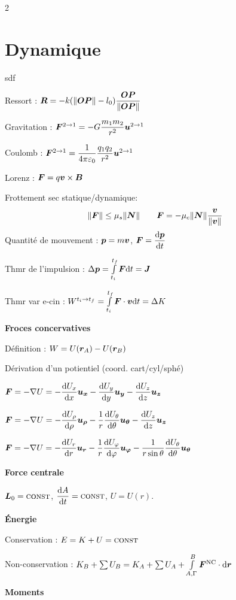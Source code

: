 \documentclass[10pt,a4paper,twoside]{article}
\begin{document}
\begin{multicols}{2}
\section*{Dynamique}

sdf

Ressort : $\bf{R} = -k (\|\bf{OP}\| - l_0) \frac{\bf{OP}}{\|\bf{OP}\|}$

Gravitation : $\bf{F}^{2 \to 1} = - G \frac{m_1m_2}{r^2}\bf{u}^{2\to 1}$

Coulomb :  $\bf{F}^{2 \to 1} = \frac{1}{4\pi \epsilon_0} \frac{q_1q_2}{r^2}\bf{u}^{2\to 1}$

Lorenz : $\bf{F} = q\bf{v}\times \bf{B}$

Frottement sec statique/dynamique:
\[
\|\bf{F}\| \leq  \mu_{s} \|\bf{N}\|  \quad  \quad 
\bf{F} = - \mu_{c} \|\bf{N}\| \frac{\bf{v}}{\|\bf{v}\|}
\]
\hr 
Quantité de mouvement : $\bf{p} = m \bf{v}$, $\bf{F} = \frac{\d \bf{p}}{\d t} $

Thmr de l'impulsion : $\Delta \bf{p} = \int_{t_{i}}^{t_{f}} \bf{F} \d t = \bf{J}$

Thmr var e-cin : $W^{t_{i} \to t_{f}} = \int_{t_{i}}^{t_{f}} \bf{F} \cdot \bf{v} \d t = \Delta K$

\textbf{Froces concervatives}

Définition : $W = U(\bf{r}_{A}) - U(\bf{r}_{B})$

Dérivation d'un potientiel (coord. cart/cyl/sphé)


$\bf{F} = -\nabla U = - \frac{  \d  U_{x}}{  \d  x}\bf{u_{x}} - \frac{  \d  U_{y}}{  \d  y}\bf{u_{y}}  - \frac{\d  U_{z}}{\d  z}\bf{u_{z}}$ 


$
\bf{F} = -\nabla  U = - \frac{\d U_{\rho}}{\d \rho} \bf{u_{\rho}} - \frac{1}{r} \frac{\d U_{\theta}}{\d \theta} \bf{u_{\theta}} - \frac{\d U_{z}}{\d z} \bf{u_{z}}
$


$
\bf{F} = -\nabla U = - \frac{\d U_{r}}{\d r} \bf{u_{r}} - \frac{1}{r} \frac{\d U_{\phi}}{\d \phi} \bf{u_{\phi}}-\frac{1}{r \sin \theta} \frac{\d U_{\theta}}{\d \theta} \bf{u_{\theta}}
$

\textbf{Force centrale} 

$\bf{L}_{0} = \const $, $\frac{\d A}{\d t} = \const $, $U = U(r)$. 

\textbf{Énergie} 

Conservation : $E = K + U = \const $

Non-conservation : $K_{B} + \sum U_{B} = K_{A} + \sum U_{A} + \int_{A, \Gamma} ^{B} \bf{F}^{\text{NC}}\cdot \d \bf{r}$

\textbf{Moments} 


\end{multicols}
\end{document}
